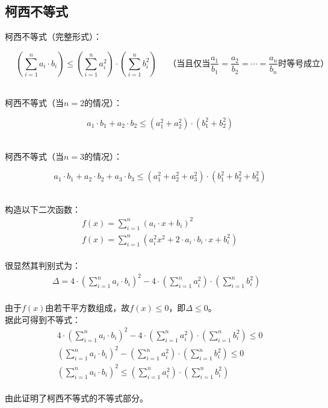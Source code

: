 \documentclass[UTF8]{ctexart}
\begin{document}
\newpage

\subsection{柯西不等式}
    柯西不等式（完整形式）：\vspace{5pt}
    \begin{large}
        \begin{equation*}
            ~~~~~~\left({\sum_{i=1}^n}a_i\cdot b_i\right)\leq\left(\sum_{i=1}^n a_i^2\right)\cdot\left(\sum_{i=1}^n b_i^2\right)~~~~~~\text{（当且仅当$\frac{a_1}{b_1}=\frac{a_2}{b_2}=\cdots=\frac{a_n}{b_n}$时等号成立）}
        \end{equation*}
    \end{large}\\[2mm]
    柯西不等式（当$n=2$的情况）：
    \begin{large}
        \begin{equation*}
            ~~~~a_1\cdot b_1+a_2\cdot b_2\leq(a_1^2+a_2^2)\cdot\left(b_1^2+b_2^2\right)
        \end{equation*}
    \end{large}\\
    柯西不等式（当$n=3$的情况）：
    \begin{large}
        \begin{equation*}
            ~~~~a_1\cdot b_1+a_2\cdot b_2+a_3\cdot b_3\leq(a_1^2+a_2^2+a_3^2)\cdot\left(b_1^2+b_2^2+b_3^2\right)
        \end{equation*}
    \end{large}\\
    构造以下二次函数：
    \setcounter{equation}{0}
    \begin{align}
        &f(x)=\sum_{i=1}^n(a_i\cdot x+b_i)^2\\[4mm]
        &f(x)=\sum_{i=1}^n\left(a_i^2x^2+2\cdot a_i\cdot b_i\cdot x+b_i^2\right)
    \end{align}\\
    很显然其判别式为：
    \begin{align}
        \Delta=4\cdot\left(\sum_{i=1}^na_i\cdot b_i\right)^2-4\cdot\left(\sum_{i=1}^n a_i^2\right)\cdot\left(\sum_{i=1}^n b_i^2\right)
    \end{align}\\
    由于$f(x)$由若干平方数组成，故$f(x)\leq 0$，即$\Delta\leq 0$。\\[3mm]
    据此可得到不等式：
    \begin{align}
        &4\cdot\left(\sum_{i=1}^na_i\cdot b_i\right)^2-4\cdot\left(\sum_{i=1}^n a_i^2\right)\cdot\left(\sum_{i=1}^n b_i^2\right)\leq 0\\[3mm]
        &\left(\sum_{i=1}^na_i\cdot b_i\right)^2-\left(\sum_{i=1}^n a_i^2\right)\cdot\left(\sum_{i=1}^n b_i^2\right)\leq 0\\[3mm]
        &\left(\sum_{i=1}^na_i\cdot b_i\right)^2\leq \left(\sum_{i=1}^n a_i^2\right)\cdot\left(\sum_{i=1}^n b_i^2\right)
    \end{align}\\
    由此证明了柯西不等式的不等式部分。
\end{document}
